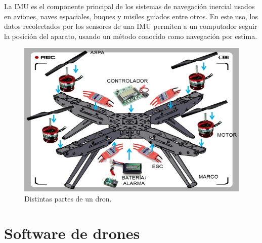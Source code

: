 La IMU es el componente principal de los sistemas de navegación inercial usados en aviones, naves espaciales, buques y misiles guiados entre otros. En este uso, los datos recolectados por los sensores de una IMU permiten a un computador seguir la posición del aparato, usando un método conocido como navegación por estima.

\begin{figure}[H]
  \centering
  \includegraphics[scale=0.8]{imagenes/partesdron.jpg}
  \caption{Distintas partes de un dron.}
  \label{fig:gnat}
\end{figure}

\section{Software de drones}

